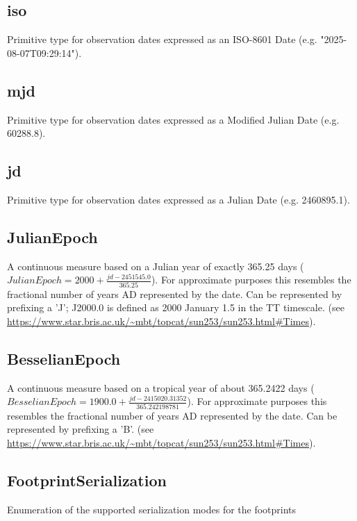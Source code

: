   \subsection{iso}
  \label{sect:iso}
  Primitive type for observation dates expressed as an ISO-8601 Date (e.g. "2025-08-07T09:29:14").

  \subsection{mjd}
  \label{sect:mjd}
  Primitive type for observation dates expressed as a Modified Julian Date (e.g. 60288.8).

  \subsection{jd}
  \label{sect:jd}
  Primitive type for observation dates expressed as a Julian Date (e.g. 2460895.1).

  \subsection{JulianEpoch}
  \label{sect:JulianEpoch}
  A continuous measure based on a Julian year of exactly 365.25 days ($JulianEpoch = 2000 + \frac{jd - 2451545.0}{365.25}$). For approximate purposes this resembles the fractional number of years AD represented by the date. Can be represented by prefixing a 'J'; J2000.0 is defined as 2000 January 1.5 in the TT timescale. (see \url{https://www.star.bris.ac.uk/~mbt/topcat/sun253/sun253.html#Times}).

  \subsection{BesselianEpoch}
  \label{sect:BesselianEpoch}
  A continuous measure based on a tropical year of about 365.2422 days ($BesselianEpoch = 1900.0 + \frac{jd - 2415020.31352}{365.242198781}$). For approximate purposes this resembles the fractional number of years AD represented by the date. Can be represented by prefixing a 'B'. (see \url{https://www.star.bris.ac.uk/~mbt/topcat/sun253/sun253.html#Times}).

  \subsection{FootprintSerialization}
  \label{sect:FootprintSerialization}

  Enumeration of the supported serialization modes for the footprints

